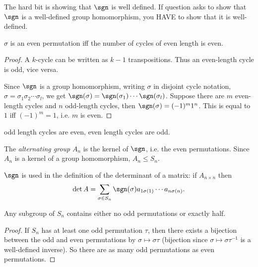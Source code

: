 \documentclass[a4pape]{article}
\begin{document}
\note The hard bit is showing that $\sgn$ is well defined. If question asks to show that $\sgn$ is a well-defined group homomorphism, you HAVE to show that it is well-defined.

\begin{lemma}
  $\sigma$ is an even permutation iff the number of cycles of even length is even.
\end{lemma}

\begin{proof}
  A $k$-cycle can be written as $k - 1$ transpositions. Thus an even-length cycle is odd, vice versa.

Since $\sgn$ is a group homomorphism, writing $\sigma$ in disjoint cycle notation, $\sigma = \sigma_1\sigma_2\cdots\sigma_l$, we get $\sgn(\sigma) = \sgn(\sigma_1)\cdots \sgn(\sigma_l)$. Suppose there are $m$ even-length cycles and $n$ odd-length cycles, then $\sgn(\sigma) = (-1)^m 1^n$. This is equal to $1$ iff $(-1)^m = 1$, i.e. $m$ is even. 
\end{proof}
\note odd length cycles are even, even length cycles are odd.

\begin{defi}
  The \emph{alternating group} $A_n$ is the kernel of $\sgn$, i.e. the even permutations.
  Since $A_n$ is a kernel of a group homomorphism, $A_n \leq S_n$.
\end{defi}
\note $\sgn$ is used in the definition of the determinant of a matrix: if $A_{n\times n}$ then
\[
\det A = \sum_{\sigma\in S_n}\sgn(\sigma) a_{1\sigma(1)}\cdots a_{n\sigma(n)}.
\]

\begin{prop}
  Any subgroup of $S_n$ contains either no odd permutations or exactly half.
\end{prop}

\begin{proof}
  If $S_n$ has at least one odd permutation $\tau$, then there exists a bijection between the odd and even permutations by $\sigma \mapsto \sigma\tau$ (bijection since $\sigma \mapsto \sigma \tau^{-1}$ is a well-defined inverse). So there are as many odd permutations as even permutations. 
\end{proof}
\end{document}

